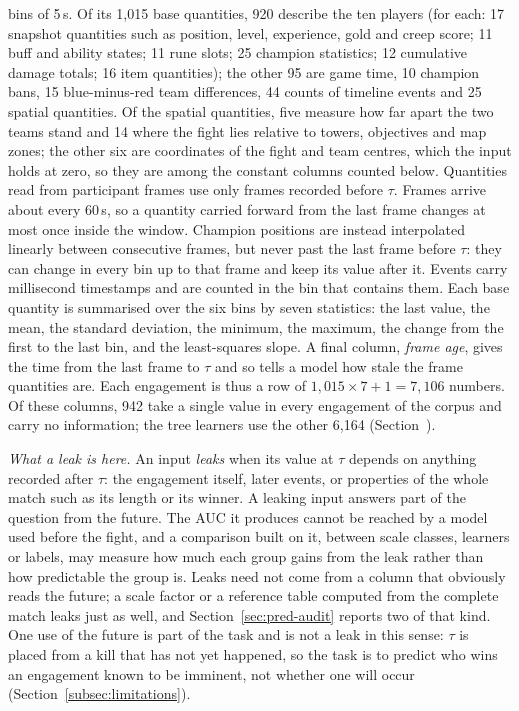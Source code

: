 bins of 5\,s. Of its 1,015 base quantities, 920 describe the ten players (for each: 17 snapshot quantities
such as position, level, experience, gold and creep score; 11 buff and ability states; 11 rune slots; 25
champion statistics; 12 cumulative damage totals; 16 item quantities); the other 95 are game time, 10
champion bans, 15 blue-minus-red team differences, 44 counts of timeline events and 25 spatial
quantities. Of the spatial quantities, five measure how far apart the two teams stand and 14 where the
fight lies relative to towers, objectives and map zones; the other six are coordinates of the fight and
team centres, which the input holds at zero, so they are among the constant columns counted below.
Quantities read from participant frames use only frames recorded before $\tau$. Frames arrive about every
60\,s, so a quantity carried forward from the
last frame changes at most once inside the window. Champion positions are instead interpolated linearly
between consecutive frames, but never past the last frame before $\tau$: they can change in every bin up
to that frame and keep its value after it. Events carry millisecond timestamps and are counted in the bin
that contains them.
Each base quantity is summarised over the six bins by seven statistics: the last value, the mean, the
standard deviation, the minimum, the maximum, the change from the first to the last bin, and the
least-squares slope. A final column, \emph{frame age}, gives the time from the last frame to $\tau$ and so
tells a model how stale the frame quantities are. Each engagement is thus a row of
$1{,}015 \times 7 + 1 = 7{,}106$ numbers. Of these columns, 942 take a single value in every engagement of
the corpus and carry no information; the tree learners use the other 6,164
(Section~).

\emph{What a leak is here.} An input \emph{leaks} when its value at $\tau$ depends on anything recorded
after $\tau$: the engagement itself, later events, or properties of the whole match such as its length or
its winner. A leaking input answers part of the question from the future. The AUC it produces cannot be
reached by a model used before the fight, and a comparison built on it, between scale classes, learners or
labels, may measure how much each group gains from the leak rather than how predictable the group is.
Leaks need not come from a column that obviously reads the future; a scale factor or a reference table
computed from the complete match leaks just as well, and Section~\ref{sec:pred-audit} reports two of that
kind. One use of the future is part of the task and is not a leak in this sense: $\tau$ is placed from a
kill that has not yet happened, so the task is to predict who wins an engagement known to be imminent,
not whether one will occur (Section~\ref{subsec:limitations}).


